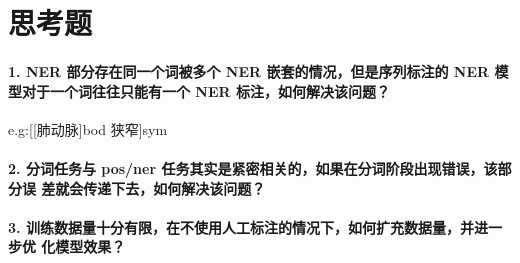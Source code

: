 \section{思考题}
\label{sec:question}

\paragraph{1. NER 部分存在同一个词被多个 NER 嵌套的情况，但是序列标注的 NER 模型对于一个词往往只能有一个 NER 标注，如何解决该问题？}

e.g:[[肺动脉]bod 狭窄]sym

\paragraph{2. 分词任务与 pos/ner 任务其实是紧密相关的，如果在分词阶段出现错误，该部分误 差就会传递下去，如何解决该问题？}

\paragraph{3. 训练数据量十分有限，在不使用人工标注的情况下，如何扩充数据量，并进一步优 化模型效果？}
